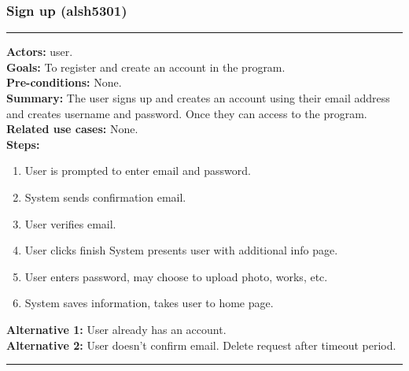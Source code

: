 \documentclass[11pt]{report}
\begin{document}
\subsubsection{Sign up (alsh5301)}
\vspace{2pt}
\hrule
\vspace{8pt}
 \textbf{Actors:} user. \\ 
 \textbf{Goals:} To register and create an account in the program. \\
 \textbf{Pre-conditions:} None. \\
 \textbf{Summary:} The user signs up and creates an account using their email address and creates username and password. Once they can access to the program. \\ 
 \textbf{Related use cases:} None. \\ 
 \textbf{Steps:} \begin{enumerate}
  \item User is prompted to enter email and password. 
  \item System sends confirmation email. 
  \item User verifies email. 
  \item User clicks finish System presents user with additional info page. 
  \item User enters password, may choose to upload photo, works, etc. 
  \item System saves information, takes user to home page. 
 \end{enumerate} 
 \textbf{Alternative 1:} User already has an account. \\ 
 \textbf{Alternative 2:} User doesn't confirm email. Delete request after timeout period. \\
 \vspace{8pt}
\hrule
\newpage
\end{document}
